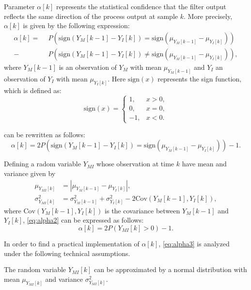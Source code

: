 Parameter $\alpha[k]$ represents the statistical confidence that 
the filter output reflects the same direction of the process output at sample $k$. 
More precisely, $\alpha[k]$ is given by the following expression:
%
\begin{align}
    \alpha[k] = \ \
    &P(\mathrm{sign}(Y_M[k-1] - Y_I[k]) =    \mathrm{sign}(\mu_{Y_M[k-1]} - \mu_{Y_I[k]})) \nonumber\\ -
    &P(\mathrm{sign}(Y_M[k-1] - Y_I[k]) \neq \mathrm{sign}(\mu_{Y_M[k-1]} - \mu_{Y_I[k]})),
\label{eq:alpha}
\end{align}
%
where $Y_M[k-1]$ is an observation of $Y_M$ with mean $\mu_{Y_M[k-1]}$
and $Y_I$ an observation of $Y_I$ with mean $\mu_{Y_I[k]}$. 
Here $\mathrm{sign}(x)$ represents the sign function, which is defined as:
%
\begin{equation}
    \mathrm{sign}(x) =
    \begin{cases}
        1, & x > 0, \\
        0, & x = 0, \\
        -1, & x < 0.
    \end{cases}
\end{equation}

 can be rewritten as follows:
%
\begin{equation}
    \alpha[k] = 
    2 P(\mathrm{sign}(Y_M[k-1] - Y_I[k]) = \mathrm{sign}(\mu_{Y_M[k-1]} - \mu_{Y_I[k]})) 
    - 1.
\label{eq:alpha2}
\end{equation}

Defining a radom variable $Y_{MI}$ whose observation at time $k$ have mean and variance given by
%
\begin{align}
    \mu_{Y_{MI}[k]} &= |\mu_{Y_M[k-1]} - \mu_{Y_I[k]}|, \\
    \sigma^2_{Y_{MI}[k]} &= \sigma^2_{Y_M[k-1]} + \sigma^2_{Y_I[k]} - 2 \mathrm{Cov}(Y_M[k-1], Y_I[k]),
\end{align}
%
where $\mathrm{Cov}(Y_M[k-1], Y_I[k])$ is the covariance between $Y_M[k-1]$ and $Y_I[k]$, 
\cref{eq:alpha2} can be expressed as follows:
%
\begin{equation}
    \alpha[k] = 2 P(Y_{MI}[k] > 0) - 1.
\label{eq:alpha3}
\end{equation}

In order to find a practical implementation of $\alpha[k]$, \cref{eq:alpha3} is analyzed under the following
technical assumptions.

\begin{assumption}
    The random variable $Y_{MI}[k]$ can be approximated by a normal distribution 
    with mean $\mu_{Y_{MI}[k]}$ and variance $\sigma^2_{Y_{MI}[k]}$.
\label{assumption:normal}
\end{assumption}

